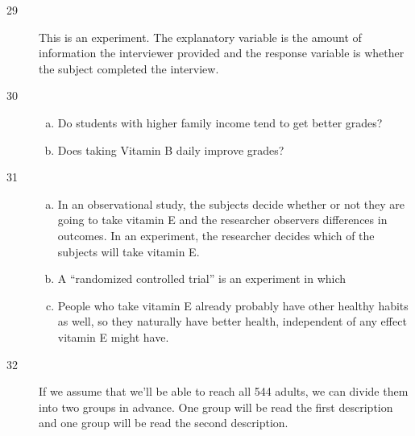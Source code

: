 \documentclass[letterpaper, landscape]{exam}
\begin{document}
  \ifprintanswers{}
    \begin{description}

      \item[29] 
        This is an experiment.  The explanatory variable is the amount of
        information the interviewer provided and the response variable is
        whether the subject completed the interview.

      \item[30]
        \begin{enumerate}[(a)]
          \item Do students with higher family income tend to get better grades?

          \item Does taking Vitamin B daily improve grades?
        \end{enumerate}

      \item[31]
        \begin{enumerate}[(a)]
          \item In an observational study, the subjects decide whether or not
            they are going to take vitamin E and the researcher observers
            differences in outcomes.  In an experiment, the researcher decides
            which of the subjects will take vitamin E.

          \item A ``randomized controlled trial'' is an experiment in which 

          \item People who take vitamin E already probably have other healthy
            habits as well, so they naturally have better health, independent of
            any effect vitamin E might have.
        \end{enumerate}

      \item[32] If we assume that we'll be able to reach all 544 adults, we can
        divide them into two groups in advance.  One group will be read the
        first description and one group will be read the second description.


\end{description}
\end{document}
